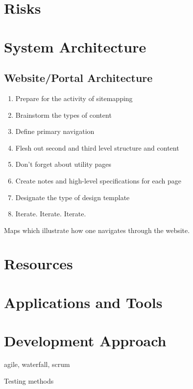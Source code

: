 \documentclass[12pt,onecolumn]{IEEEtran}
\begin{document}
\section{Risks} \label{sec:Risks}

\section{System Architecture} \label{sec:SystemArchitecture}

\subsection{Website/Portal Architecture} \label{sec:WebsiteArchitecture}

\begin{enumerate}
\item Prepare for the activity of sitemapping
\item Brainstorm the types of content
\item Define primary navigation
\item Flesh out second and third level structure and content
\item Don’t forget about utility pages
\item Create notes and high-level specifications for each page
\item Designate the type of design template
\item Iterate. Iterate. Iterate.
\end{enumerate}

Maps which illustrate how one navigates through the website. 

\section{Resources} \label{sec:Resources}

\section{Applications and Tools} \label{sec:ApplicationsAndTools}

\section{Development Approach} \label{sec:Development Approach}

agile, waterfall, scrum

Testing methods
\end{document}
